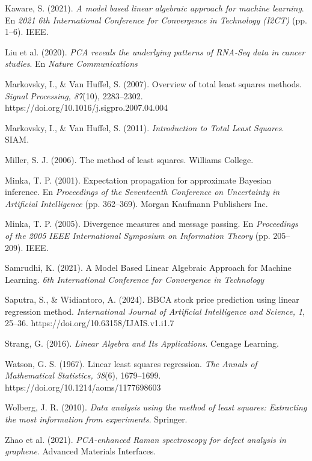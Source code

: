 \documentclass[12pt]{article}
\begin{document}
        \hangindent=0.5in  Kaware, S. (2021). \textit{A model based linear algebraic approach for machine learning}. En \textit{2021 6th International Conference for Convergence in Technology (I2CT)} (pp. 1–6). IEEE.\par
        \hangindent=0.5in  Liu et al. (2020). \textit{PCA reveals the underlying patterns of RNA-Seq data in cancer studies}. En \textit{Nature Communications} \par
        \hangindent=0.5in  Markovsky, I., \& Van Huffel, S. (2007). Overview of total least squares methods. \textit{Signal Processing, 87}(10), 2283–2302. https://doi.org/10.1016/j.sigpro.2007.04.004\par
        \hangindent=0.5in  Markovsky, I., \& Van Huffel, S. (2011). \textit{Introduction to Total Least Squares}. SIAM.\par
        \hangindent=0.5in  Miller, S. J. (2006). The method of least squares. Williams College.\par
        \hangindent=0.5in  Minka, T. P. (2001). Expectation propagation for approximate Bayesian inference. En \textit{Proceedings of the Seventeenth Conference on Uncertainty in Artificial Intelligence} (pp. 362–369). Morgan Kaufmann Publishers Inc.\par
        \hangindent=0.5in  Minka, T. P. (2005). Divergence measures and message passing. En \textit{Proceedings of the 2005 IEEE International Symposium on Information Theory} (pp. 205–209). IEEE.\par
        \hangindent=0.5in  Samrudhi, K. (2021). A Model Based Linear Algebraic Approach for Machine Learning. \textit{6th International Conference for Convergence in Technology} \par
        \hangindent=0.5in  Saputra, S., \& Widiantoro, A. (2024). BBCA stock price prediction using linear regression method. \textit{International Journal of Artificial Intelligence and Science, 1}, 25–36. https://doi.org/10.63158/IJAIS.v1.i1.7\par
        \hangindent=0.5in  Strang, G. (2016). \textit{Linear Algebra and Its Applications}. Cengage Learning.\par
        \hangindent=0.5in  Watson, G. S. (1967). Linear least squares regression. \textit{The Annals of Mathematical Statistics, 38}(6), 1679–1699. https://doi.org/10.1214/aoms/1177698603\par
        \hangindent=0.5in  Wolberg, J. R. (2010). \textit{Data analysis using the method of least squares: Extracting the most information from experiments}. Springer.\par
        \hangindent=0.5in  Zhao et al. (2021). \textit{PCA-enhanced Raman spectroscopy for defect analysis in graphene}. Advanced Materials Interfaces.\par
        
\end{document}
